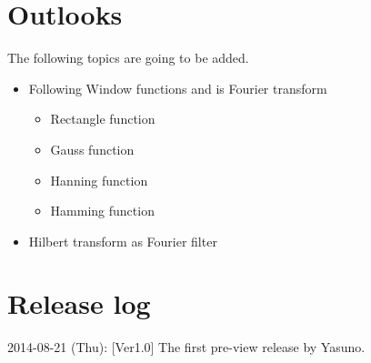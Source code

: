 \documentclass[a4paper]{article}
\begin{document}
\section*{Outlooks}
The following topics are going to be added.
\begin{itemize}
	\item Following Window functions and is Fourier transform
	\begin{itemize}
		\item Rectangle function
		\item Gauss function
		\item Hanning function
		\item Hamming function
	\end{itemize}
	\item Hilbert transform as Fourier filter
\end{itemize}

\section*{Release log}
2014-08-21 (Thu): [Ver1.0] The first pre-view release by Yasuno.
\end{document}

